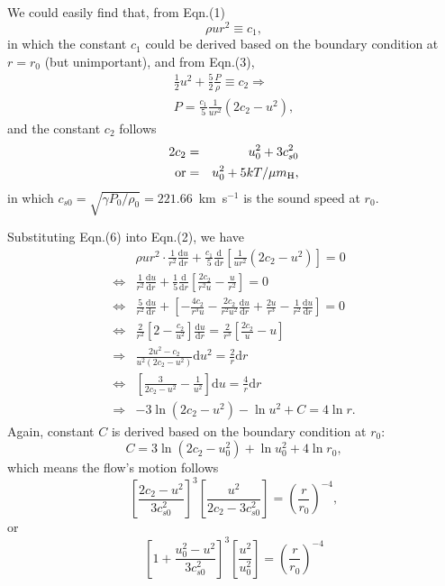 \documentclass[preprint,12pt,longnamesfirst]{aastex}
\newcommand{\ud}{\mathrm{d}}
\begin{document}
We could easily find that, from Eqn.(1)
\begin{equation}
  \rho{}ur^2\equiv c_1,
\end{equation}
in which the constant $c_1$ could be derived based on the boundary
condition at $r=r_0$ (but unimportant), and from Eqn.(3),
\begin{eqnarray}
  \frac{1}{2}u^2+\frac{5}{2}\frac{P}{\rho}\equiv c_2 \Rightarrow \\
  P=\frac{c_1}{5}\frac{1}{ur^2}\left(2c_2-u^2\right),
\end{eqnarray}
and the constant $c_2$ follows
\begin{eqnarray*}
  2c_2 &=& u^2_0+3c^2_{s0} \\
  {\rm or} &=& u^2_0+5kT/\mu{}m_{\rm H},
\end{eqnarray*}
in which $c_{s0}=\sqrt{\gamma{}P_0/\rho_0}=221.66$~km~s$^{-1}$
is the sound speed at $r_0$.

Substituting Eqn.(6) into Eqn.(2), we have
\begin{eqnarray*}
 & \rho{}ur^2\cdot\frac{1}{r^2}\frac{\ud u}{\ud r} +
    \frac{c_1}{5}\frac{\ud}{\ud r}
      \left[\frac{1}{ur^2}\left(2c_2 - u^2\right)\right] = 0 \\
\Leftrightarrow & \frac{1}{r^2}\frac{\ud u}{\ud r} +
    \frac{1}{5}\frac{\ud}{\ud r}
      \left[\frac{2c_2}{r^2u}-\frac{u}{r^2}\right] = 0 \\
\Leftrightarrow & \frac{5}{r^2}\frac{\ud u}{\ud r} +
    \left[-\frac{4c_2}{r^3u}-\frac{2c_2}{r^2u^2}\frac{\ud u}{\ud r}
      +\frac{2u}{r^3}-\frac{1}{r^2}\frac{\ud u}{\ud r}\right] = 0 \\
\Leftrightarrow & \frac{2}{r^2}\left[2-\frac{c_2}{u^2}\right]
  \frac{\ud u}{\ud r} = \frac{2}{r^3}\left[\frac{2c_2}{u}-u\right] \\
\Rightarrow & \frac{2u^2-c_2}{u^2(2c_2-u^2)}\ud u^2 =
  \frac{2}{r}\ud r \\
\Leftrightarrow & \left[\frac{3}{2c_2-u^2}-\frac{1}{u^2}\right]\ud u
  = \frac{4}{r}\ud r\\
\Rightarrow & -3\ln(2c_2-u^2) - \ln u^2 + C = 4\ln r.
\end{eqnarray*}
Again, constant $C$ is derived based on the boundary condition at $r_0$:
\begin{equation}
  C=3\ln(2c_2-u^2_0)+\ln u^2_0 + 4\ln r_0,
\end{equation}
which means the flow's motion follows
\begin{equation}
  \left[\frac{2c_2-u^2}{3c^2_{s0}}\right]^3
  \left[\frac{u^2}{2c_2-3c^2_{s0}}\right]
  = \left(\frac{r}{r_0}\right)^{-4},
\end{equation}
or
\begin{equation}
  \left[1+\frac{u^2_0-u^2}{3c^2_{s0}}\right]^3
    \left[\frac{u^2}{u^2_0}\right]
    = \left(\frac{r}{r_0}\right)^{-4}
\end{equation}
\end{document}
